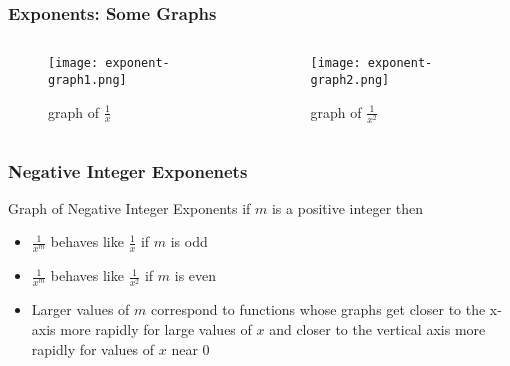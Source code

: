 \begin{frame}
    \frametitle{Exponents: Some Graphs}
    \begin{columns}
      \begin{column}{0.5\textwidth}
        \begin{figure}
          \texttt{[image: exponent-graph1.png]}
          \caption{graph of \(\frac{1}{x}\)}
        \end{figure}
      \end{column}
      \begin{column}{0.5\textwidth}
        \begin{figure}
          \texttt{[image: exponent-graph2.png]}
          \caption{graph of \(\frac{1}{x^{2}}\)}
        \end{figure}
      \end{column}
    \end{columns}
\end{frame}
\begin{frame}
  \frametitle{Negative Integer Exponenets}
  \begin{alertblock}{Graph of Negative Integer Exponents}
    if \(m\) is  a positive integer then
    \begin{itemize}
      \item \(\frac{1}{x^{m}}\) behaves like \(\frac{1}{x}\) if \(m\) is odd
      \item \(\frac{1}{x^{m}}\) behaves like \(\frac{1}{x^{2}}\) if \(m\) is even
      \item Larger values of \(m\) correspond to functions whose graphs get closer to the x-axis more rapidly for large values of \(x\)
      and closer to the vertical axis more rapidly for values of \(x\) near 0
    \end{itemize} 
  \end{alertblock}  

\end{frame}


